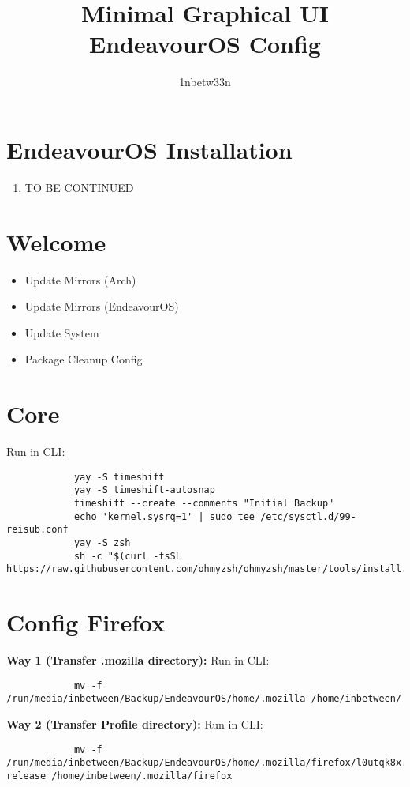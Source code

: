 \documentclass[12pt]{article}
\title{Minimal Graphical UI EndeavourOS Config}
\author{1nbetw33n}
\begin{document}
    \maketitle

    \section{EndeavourOS Installation}\label{sec:endeavouros-installation}
        \begin{enumerate}
            \item TO BE CONTINUED
        \end{enumerate}

    \section{Welcome}\label{sec:welcome}
        \begin{itemize}
            \item Update Mirrors (Arch)
            \item Update Mirrors (EndeavourOS)
            \item Update System
            \item Package Cleanup Config
        \end{itemize}


    \section{Core}\label{sec:core}
        Run in CLI:
        \begin{verbatim}
            yay -S timeshift
            yay -S timeshift-autosnap
            timeshift --create --comments "Initial Backup"
            echo 'kernel.sysrq=1' | sudo tee /etc/sysctl.d/99-reisub.conf
            yay -S zsh
            sh -c "$(curl -fsSL https://raw.githubusercontent.com/ohmyzsh/ohmyzsh/master/tools/install.sh)"
        \end{verbatim}


    \section{Config Firefox}\label{sec:config-firefox}
        \textbf{Way 1 (Transfer .mozilla directory):}
        \newline Run in CLI:
        \begin{verbatim}
            mv -f /run/media/inbetween/Backup/EndeavourOS/home/.mozilla /home/inbetween/
        \end{verbatim}
        \textbf{Way 2 (Transfer Profile directory):}
        \newline Run in CLI:
        \begin{verbatim}
            mv -f /run/media/inbetween/Backup/EndeavourOS/home/.mozilla/firefox/l0utqk8x.default-release /home/inbetween/.mozilla/firefox
        \end{verbatim}
\end{document}
